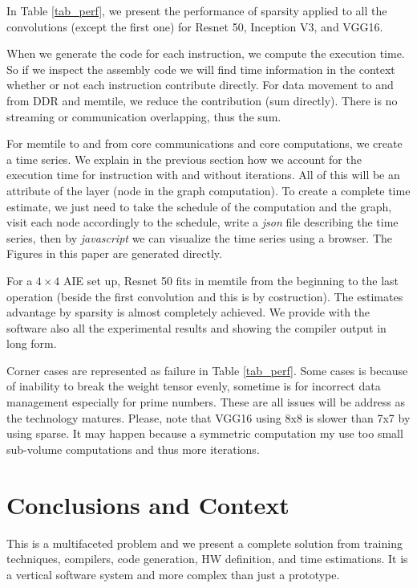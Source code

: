\documentclass[sigconf]{acmart}
\begin{document}
In Table \ref{tab_perf}, we present the performance of sparsity
applied to all the convolutions (except the first one) for Resnet 50,
Inception V3, and VGG16.


When we generate the code for each instruction, we compute the
execution time. So if we inspect the assembly code we will find time
information in the context whether or not each instruction contribute
directly. For data movement to and from DDR and memtile, we reduce
the contribution (sum directly). There is no streaming or
communication overlapping, thus the sum.

For memtile  to and from core communications and core computations, we
create a time series. We explain in the previous section how we
account for the execution time for instruction with and without
iterations. All of this will be an attribute of the layer (node in the
graph computation).  To create a complete time estimate, we just need
to take the schedule of the computation and the graph, visit each node
accordingly to the schedule, write a {\em json} file describing the
time series, then by {\em javascript} we can visualize the time series
using a browser. The Figures in this paper are generated directly.

For a $4\times 4$ AIE set up, Resnet 50 fits in memtile from the
beginning to the last operation (beside the first convolution and this
is by costruction). The estimates advantage by sparsity is almost
completely achieved. We provide with the software also all the
experimental results %
and showing the compiler output in long form.

Corner cases are represented as failure in Table \ref{tab_perf}. Some
cases is because of inability to break the weight tensor evenly,
sometime is for incorrect data management especially for prime
numbers. These are all issues will be address as the technology
matures. Please, note that VGG16 using 8x8 is slower than 7x7 by using
sparse.  It may happen because a symmetric computation my use too
small sub-volume computations and thus more iterations.

\section{Conclusions and Context}
This is a multifaceted problem and we present a complete solution from
training techniques, compilers, code generation, HW definition, and
time estimations. It is a vertical software system and more complex
than just a prototype.
\end{document}
